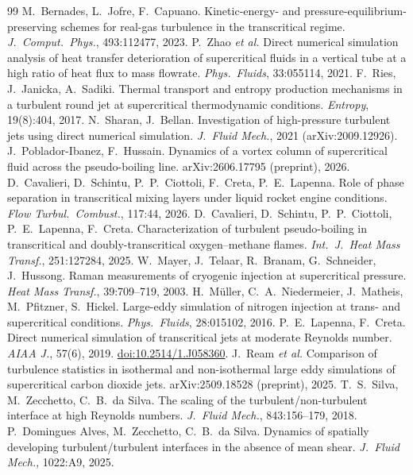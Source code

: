 \documentclass[11pt]{article}
\begin{document}
\begin{thebibliography}{99}
 M.\ Bernades, L.\ Jofre, F.\ Capuano. Kinetic-energy- and pressure-equilibrium-preserving schemes for real-gas turbulence in the transcritical regime. \emph{J.\ Comput.\ Phys.}, 493:112477, 2023.
 P.\ Zhao \emph{et al.} Direct numerical simulation analysis of heat transfer deterioration of supercritical fluids in a vertical tube at a high ratio of heat flux to mass flowrate. \emph{Phys.\ Fluids}, 33:055114, 2021.
 F.\ Ries, J.\ Janicka, A.\ Sadiki. Thermal transport and entropy production mechanisms in a turbulent round jet at supercritical thermodynamic conditions. \emph{Entropy}, 19(8):404, 2017.
 N.\ Sharan, J.\ Bellan. Investigation of high-pressure turbulent jets using direct numerical simulation. \emph{J.\ Fluid Mech.}, 2021 (arXiv:2009.12926).
 J.\ Poblador-Ibanez, F.\ Hussain. Dynamics of a vortex column of supercritical fluid across the pseudo-boiling line. arXiv:2606.17795 (preprint), 2026.
 D.\ Cavalieri, D.\ Schintu, P.\ P.\ Ciottoli, F.\ Creta, P.\ E.\ Lapenna. Role of phase separation in transcritical mixing layers under liquid rocket engine conditions. \emph{Flow Turbul.\ Combust.}, 117:44, 2026.
 D.\ Cavalieri, D.\ Schintu, P.\ P.\ Ciottoli, P.\ E.\ Lapenna, F.\ Creta. Characterization of turbulent pseudo-boiling in transcritical and doubly-transcritical oxygen--methane flames. \emph{Int.\ J.\ Heat Mass Transf.}, 251:127284, 2025.
 W.\ Mayer, J.\ Telaar, R.\ Branam, G.\ Schneider, J.\ Hussong. Raman measurements of cryogenic injection at supercritical pressure. \emph{Heat Mass Transf.}, 39:709--719, 2003.
 H.\ M\"uller, C.\ A.\ Niedermeier, J.\ Matheis, M.\ Pfitzner, S.\ Hickel. Large-eddy simulation of nitrogen injection at trans- and supercritical conditions. \emph{Phys.\ Fluids}, 28:015102, 2016.
 P.\ E.\ Lapenna, F.\ Creta. Direct numerical simulation of transcritical jets at moderate Reynolds number. \emph{AIAA J.}, 57(6), 2019. \href{https://doi.org/10.2514/1.J058360}{doi:10.2514/1.J058360}.
 J.\ Ream \emph{et al.} Comparison of turbulence statistics in isothermal and non-isothermal large eddy simulations of supercritical carbon dioxide jets. arXiv:2509.18528 (preprint), 2025.
 T.\ S.\ Silva, M.\ Zecchetto, C.\ B.\ da Silva. The scaling of the turbulent/non-turbulent interface at high Reynolds numbers. \emph{J.\ Fluid Mech.}, 843:156--179, 2018.
 P.\ Domingues Alves, M.\ Zecchetto, C.\ B.\ da Silva. Dynamics of spatially developing turbulent/turbulent interfaces in the absence of mean shear. \emph{J.\ Fluid Mech.}, 1022:A9, 2025.

\end{thebibliography}
\end{document}
